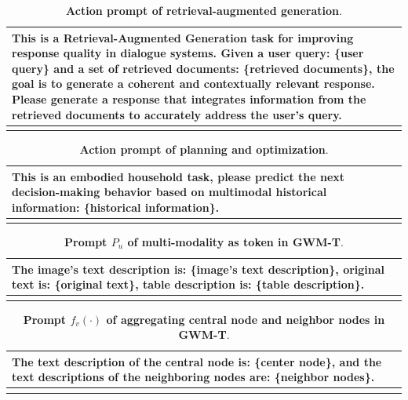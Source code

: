 \begin{table}[h]
\centering
\caption{\textbf{Action prompt of retrieval-augmented generation}.}
\begin{tabular}{p{13cm}}
\toprule[1.1pt]
    This is a Retrieval-Augmented Generation task for improving response quality in dialogue systems. Given a user query: \{user query\} and a set of retrieved documents: \{retrieved documents\}, the goal is to generate a coherent and contextually relevant response. Please generate a response that integrates information from the retrieved documents to accurately address the user's query. \\
\bottomrule[1.1pt]
\label{prompt-template:retrieval-augmented generation}
\end{tabular}
\end{table}

\begin{table}[h]
\centering
\caption{\textbf{Action prompt of planning and optimization}.}
\begin{tabular}{p{13cm}}
\toprule[1.1pt]
    This is an embodied household task, please predict the next decision-making behavior based on multimodal historical information: \{historical information\}. \\
\bottomrule[1.1pt]
\label{prompt-template:planning and optimization}
\end{tabular}
\end{table}

\begin{table}[h]
\centering
\caption{\textbf{Prompt $P_{u}$ of multi-modality as token in GWM-T}.}
\begin{tabular}{p{13cm}}
\toprule[1.1pt]
    The image's text description is: \{image's text description\}, original text is: \{original text\}, table description is: \{table description\}. \\
\bottomrule[1.1pt]
\label{prompt-template:multi-modality as token}
\end{tabular}
\end{table}


\begin{table}[h]
\centering
\caption{\textbf{Prompt $f_{v}(\cdot)$ of aggregating central node and neighbor nodes in GWM-T}.}
\begin{tabular}{p{13cm}}
\toprule[1.1pt]
    The text description of the central node is: \{center node\}, and the text descriptions of the neighboring nodes are: \{neighbor nodes\}. \\
\bottomrule[1.1pt]
\label{prompt-template:aggregating}
\end{tabular}
\end{table}



